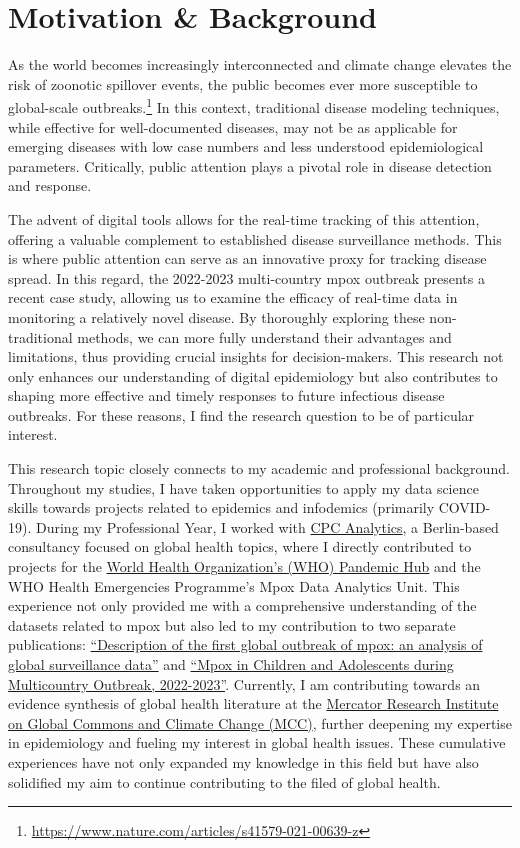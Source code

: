 \documentclass[
  letterpaper,
  DIV=11,
  numbers=noendperiod]{scrartcl}
\begin{document}
\hypertarget{motivation-background}{%
\section{Motivation \& Background}\label{motivation-background}}

As the world becomes increasingly interconnected and climate change
elevates the risk of zoonotic spillover events, the public becomes ever
more susceptible to global-scale outbreaks.\footnote{\url{https://www.nature.com/articles/s41579-021-00639-z}}
In this context, traditional disease modeling techniques, while
effective for well-documented diseases, may not be as applicable for
emerging diseases with low case numbers and less understood
epidemiological parameters. Critically, public attention plays a pivotal
role in disease detection and response.

The advent of digital tools allows for the real-time tracking of this
attention, offering a valuable complement to established disease
surveillance methods. This is where public attention can serve as an
innovative proxy for tracking disease spread. In this regard, the
2022-2023 multi-country mpox outbreak presents a recent case study,
allowing us to examine the efficacy of real-time data in monitoring a
relatively novel disease. By thoroughly exploring these non-traditional
methods, we can more fully understand their advantages and limitations,
thus providing crucial insights for decision-makers. This research not
only enhances our understanding of digital epidemiology but also
contributes to shaping more effective and timely responses to future
infectious disease outbreaks. For these reasons, I find the research
question to be of particular interest.

This research topic closely connects to my academic and professional
background. Throughout my studies, I have taken opportunities to apply
my data science skills towards projects related to epidemics and
infodemics (primarily COVID-19). During my Professional Year, I worked
with \href{https://cpc-analytics.com/home/}{CPC Analytics}, a
Berlin-based consultancy focused on global health topics, where I
directly contributed to projects for the
\href{https://pandemichub.who.int/}{World Health Organization's (WHO)
Pandemic Hub} and the WHO Health Emergencies Programme's Mpox Data
Analytics Unit. This experience not only provided me with a
comprehensive understanding of the datasets related to mpox but also led
to my contribution to two separate publications:
\href{https://doi.org/10.1016/S2214-109X(23)00198-5}{``Description of
the first global outbreak of mpox: an analysis of global surveillance
data''} and \href{https://doi.org/10.3201/eid2910.230516}{``Mpox in
Children and Adolescents during Multicountry Outbreak, 2022-2023''}.
Currently, I am contributing towards an evidence synthesis of global
health literature at the \href{https://www.mcc-berlin.net/}{Mercator
Research Institute on Global Commons and Climate Change (MCC)}, further
deepening my expertise in epidemiology and fueling my interest in global
health issues. These cumulative experiences have not only expanded my
knowledge in this field but have also solidified my aim to continue
contributing to the filed of global health.
\end{document}
